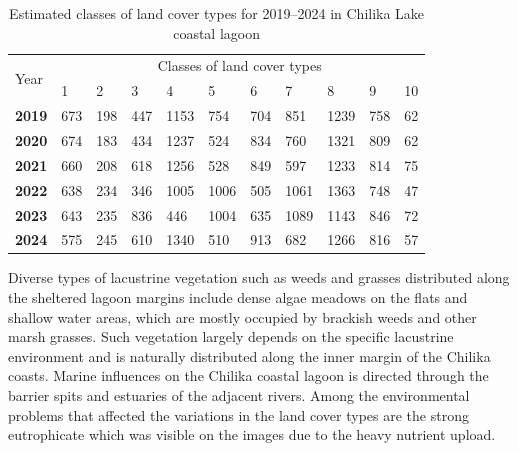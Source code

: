 \documentclass[jmse,article,submit,pdftex,moreauthors]{Definitions/mdpi}
\begin{document}
\begin{table}[H]
  \centering
  \begin{tabularx}{\textwidth}{p{0.9cm}p{0.9cm}p{0.9cm}p{0.9cm}p{0.9cm}p{0.9cm}p{0.9cm}p{0.9cm}p{0.9cm}p{0.9cm}p{0.9cm}}
  \toprule
  \multirow{2}{*}{Year} & \multicolumn{10}{c}{Classes of land cover types} \\
     & 1 & 2 & 3 & 4 & 5 & 6 & 7 & 8 & 9 & 10 \\
    \midrule
    \textbf{2019} & 673 & 198 & 447 & 1153 & 754 & 704 & 851 & 1239 & 758 & 62 \\
    \textbf{2020} & 674 & 183 & 434 & 1237 & 524 & 834 & 760 & 1321 & 809 & 62 \\
    \textbf{2021} & 660 & 208 & 618 & 1256 & 528 & 849 & 597 & 1233 & 814 & 75 \\
    \textbf{2022} & 638 & 234 & 346 & 1005 & 1006 & 505 & 1061 & 1363 & 748 & 47 \\
     \textbf{2023} & 643 & 235 & 836 & 446 & 1004 & 635 & 1089 & 1143 & 846 & 72 \\
    \textbf{2024}  & 575 & 245 & 610 & 1340 & 510 & 913 & 682 & 1266 & 816 & 57 \\
\bottomrule
\end{tabularx}
  \caption{Estimated classes of land cover types for 2019--2024 in Chilika Lake coastal lagoon}
  \label{tab01}
\end{table}


Diverse types of lacustrine vegetation such as weeds and grasses distributed along the sheltered lagoon margins include dense algae meadows on the flats and shallow water areas, which are mostly occupied by brackish weeds and other marsh grasses. Such vegetation largely depends on the specific lacustrine environment and is naturally distributed along the inner margin of the Chilika coasts. Marine influences on the Chilika coastal lagoon is directed through the barrier spits and estuaries of the adjacent rivers. Among the environmental problems that affected the variations in the land cover types are the strong eutrophicate which was visible on the images due to the heavy nutrient upload. 
\end{document}

